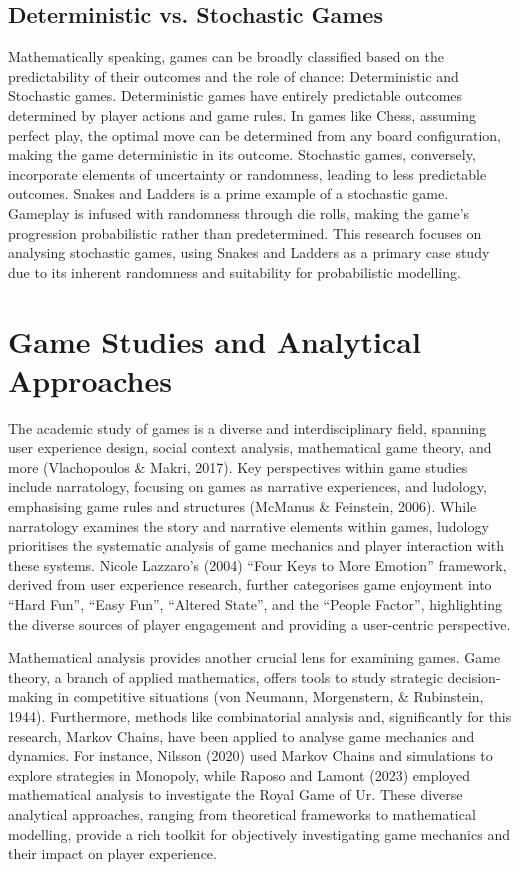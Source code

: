 \subsection{Deterministic vs. Stochastic Games}
Mathematically speaking, games can be broadly classified based on the predictability of their outcomes and the role of chance: Deterministic and Stochastic games. Deterministic games have entirely predictable outcomes determined by player actions and game rules. In games like Chess, assuming perfect play, the optimal move can be determined from any board configuration, making the game deterministic in its outcome.  Stochastic games, conversely, incorporate elements of uncertainty or randomness, leading to less predictable outcomes. Snakes and Ladders is a prime example of a stochastic game.  Gameplay is infused with randomness through die rolls, making the game's progression probabilistic rather than predetermined. This research focuses on analysing stochastic games, using Snakes and Ladders as a primary case study due to its inherent randomness and suitability for probabilistic modelling.  

\section{Game Studies and Analytical Approaches}


The academic study of games is a diverse and interdisciplinary field, spanning user experience design, social context analysis, mathematical game theory, and more (Vlachopoulos \& Makri, 2017). Key perspectives within game studies include narratology, focusing on games as narrative experiences, and ludology, emphasising game rules and structures (McManus \& Feinstein, 2006). While narratology examines the story and narrative elements within games, ludology prioritises the systematic analysis of game mechanics and player interaction with these systems.  Nicole Lazzaro’s (2004) ``Four Keys to More Emotion'' framework, derived from user experience research, further categorises game enjoyment into “Hard Fun”, “Easy Fun”, “Altered State”, and the “People Factor”, highlighting the diverse sources of player engagement and providing a user-centric perspective.

Mathematical analysis provides another crucial lens for examining games. Game theory, a branch of applied mathematics, offers tools to study strategic decision-making in competitive situations (von Neumann, Morgenstern, \& Rubinstein, 1944).  Furthermore, methods like combinatorial analysis and, significantly for this research, Markov Chains, have been applied to analyse game mechanics and dynamics.  For instance, Nilsson (2020) used Markov Chains and simulations to explore strategies in Monopoly, while Raposo and Lamont (2023) employed mathematical analysis to investigate the Royal Game of Ur. These diverse analytical approaches, ranging from theoretical frameworks to mathematical modelling, provide a rich toolkit for objectively investigating game mechanics and their impact on player experience.

